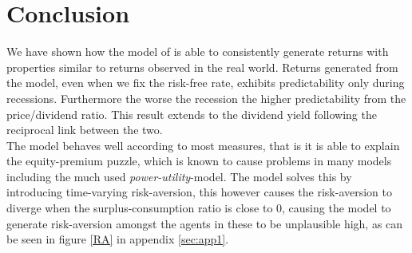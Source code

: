 \section{Conclusion} \label{sec:Conclusion}
We have shown how the model of \citet{Campbell1999} is able to consistently generate returns with properties similar to returns observed in the real world. Returns generated from the model, even when we fix the risk-free rate, exhibits predictability only during recessions. Furthermore the worse the recession the higher predictability from the price/dividend ratio. This result extends to the dividend yield following the reciprocal link between the two. \\
The model behaves well according to most measures, that is it is able to explain the equity-premium puzzle, which is known to cause problems in many models including the much used \textit{power-utility}-model. The \citet{Campbell1999} model solves this by introducing time-varying risk-aversion, this however causes the risk-aversion to diverge when the surplus-consumption ratio is close to 0, causing the model to generate risk-aversion amongst the agents in these to be unplausible high, as can be seen in figure \ref{RA} in appendix \ref{sec:app1}.



\begin{comment}
While not telling us much about the empirical US-economy we have shown that by using a very simple regime-switching model when predicting future returns, the \citet{Campbell1999}-model is able to generate data with properties similar to the behavior of real-world stock returns. That is the predictability of stock returns are almost non-existent when examining expansionary periods, and much more predictable when examining recession-periods even when the underlying data-generating process is exactly the same. \\
However the result does not seem to be robust when the recession chain is unknown or poorly estimated, this makes the results difficult to exploit for profit for a typical investor.

Thus if the \citet{Campbell1999}-model is indeed a good approximation of the true underlying data-generating process of stock returns, our results shows that if one were able to consistently predict business-cycle variation, one could exploit the fact that stock returns are predictable during recessions while diminishing entering expansions. This piece of information would indeed be of value to the typical mean-variance investor.\\
The more pressing fact is that the economy is seldom in recession, only around 14\% of the post-war period, and thus the results implies that only in 14\% of the post-war periods returns are actually predictable, while in the remaining 86\% periods stocks are essentially a much riskier 50/50 gamble.
\end{comment}